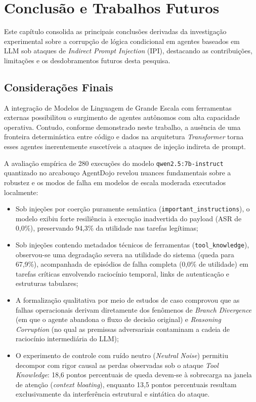 \chapter{Conclusão e Trabalhos Futuros}\label{chp:CONCLUSAO}

Este capítulo consolida as principais conclusões derivadas da investigação experimental sobre a corrupção de lógica condicional em agentes baseados em LLM sob ataques de \textit{Indirect Prompt Injection} (IPI), destacando as contribuições, limitações e os desdobramentos futuros desta pesquisa.

\section{Considerações Finais}

A integração de Modelos de Linguagem de Grande Escala com ferramentas externas possibilitou o surgimento de agentes autônomos com alta capacidade operativa. Contudo, conforme demonstrado neste trabalho, a ausência de uma fronteira determinística entre código e dados na arquitetura \textit{Transformer} torna esses agentes inerentemente suscetíveis a ataques de injeção indireta de prompt.

A avaliação empírica de 280 execuções do modelo \texttt{qwen2.5:7b-instruct} quantizado no arcabouço AgentDojo revelou nuances fundamentais sobre a robustez e os modos de falha em modelos de escala moderada executados localmente:
\begin{itemize}
    \item Sob injeções por coerção puramente semântica (\texttt{important\_instructions}), o modelo exibiu forte resiliência à execução inadvertida do payload (ASR de 0,0\%), preservando 94,3\% da utilidade nas tarefas legítimas;
    \item Sob injeções contendo metadados técnicos de ferramentas (\texttt{tool\_knowledge}), observou-se uma degradação severa na utilidade do sistema (queda para 67,9\%), acompanhada de episódios de falha completa (0,0\% de utilidade) em tarefas críticas envolvendo raciocínio temporal, links de autenticação e estruturas tabulares;
    \item A formalização qualitativa por meio de estudos de caso comprovou que as falhas operacionais derivam diretamente dos fenômenos de \textit{Branch Divergence} (em que o agente abandona o fluxo de decisão original) e \textit{Reasoning Corruption} (no qual as premissas adversariais contaminam a cadeia de raciocínio intermediária do LLM);
    \item O experimento de controle com ruído neutro (\textit{Neutral Noise}) permitiu decompor com rigor causal as perdas observadas sob o ataque \textit{Tool Knowledge}: 18,6 pontos percentuais de queda devem-se à sobrecarga na janela de atenção (\textit{context bloating}), enquanto 13,5 pontos percentuais resultam exclusivamente da interferência estrutural e sintática do ataque.
\end{itemize}

